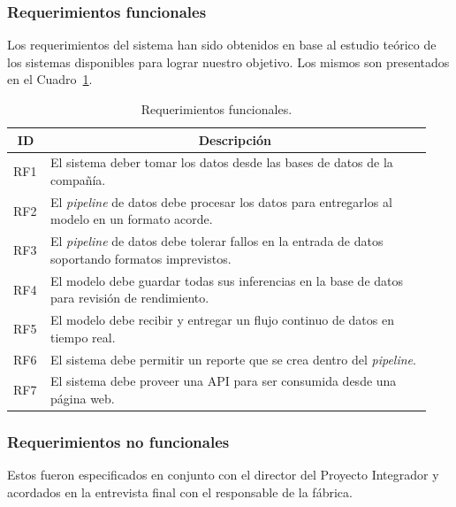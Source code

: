 \documentclass[a4paper,12pt]{article}
\begin{document}
\subsubsection{Requerimientos funcionales}
Los requerimientos del sistema han sido obtenidos en base al estudio teórico de los sistemas disponibles para lograr nuestro objetivo. Los mismos son presentados en el Cuadro~\ref{tab:functional-requirements}.

\begin{table}[H]
	\centering
	\begin{tabular}{p{0.07\linewidth} p{0.87\linewidth}}
		\hline
		\multicolumn{1}{c}{\textbf{ID}} & \multicolumn{1}{c}{\textbf{Descripción}}                                                                 \\ \hline
		RF1                             & El sistema deber tomar los datos desde las bases de datos de la compañía.                               \\
		RF2                             & El \textit{pipeline} de datos debe procesar los datos para entregarlos al modelo en un formato acorde.    \\
		RF3                             & El \textit{pipeline} de datos debe tolerar fallos en la entrada de datos soportando formatos imprevistos. \\
		RF4                             & El modelo debe guardar todas sus inferencias en la base de datos para revisión de rendimiento.           \\
		RF5                             & El modelo debe recibir y entregar un flujo continuo de datos en tiempo real.                              \\
		RF6                             & El sistema debe permitir un reporte que se crea dentro del \textit{pipeline}.                             \\
		RF7                             & El sistema debe proveer una API para ser consumida desde una página web.                                 \\ \hline
	\end{tabular}
	\caption{Requerimientos funcionales.}
	\label{tab:functional-requirements}
\end{table}

\subsubsection{Requerimientos no funcionales}
Estos fueron especificados en conjunto con el director del Proyecto Integrador y acordados en la entrevista final con el responsable de la fábrica.
\end{document}
